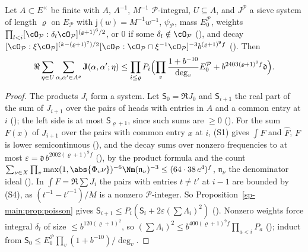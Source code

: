 \begin{theorem}\label{sp-main:thm:sieve}
Let $A\subset E^\times$ be finite with $A$, $A^{-1}$, $M^{-1}$ $\mathcal P$-integral, $U\subseteq A$, and
$J^{\mathcal P}$ a sieve system of length $\varrho$ on $E_{\mathcal P}$ with $\mathsf j(w)=M^{-1}w^{-1}$, $\psi_{\mathcal P}$,
mass $E^{\mathcal P}_0$, weights $\prod_{l<i}[\cO_{\mathcal P}:\delta_l\cO_{\mathcal P}]^{(\varrho+1)^6/2}$, or $0$ if some
$\delta_l\notin\cO_{\mathcal P}$ (), and decay $[\cO_{\mathcal P}:\xi\cO_{\mathcal P}]^{(k-
(\varrho+1)^7)/2}[\cO_{\mathcal P}:\cO_{\mathcal P}\cap\xi^{-1}\cO_{\mathcal P}]^{-3}b^{(\varrho+1)^9f}$
(). Then
\[
\Re\sum_{\eta\in U}\sum_{\alpha,\alpha'\in A^\varrho}\mathbf J(\alpha,\alpha';\eta)\le
\prod_{i\le\varrho}P_i\Bigl(\prod_v\frac{1+b^{-10}}{\deg_v}E^{\mathcal P}_0+b^{2403(\varrho+1)^9f}\mathfrak d\Bigr).
\]
\end{theorem}

\begin{proof}
The products $J_i$ form a system. Let $\mathsf S_0=\Re J_0$ and $\mathsf S_{i+1}$ the real part of the sum of
$J_{i+1}$ over the pairs of heads with entries in $A$ and a common entry at $i$
(); the left side is at most $\mathsf S_{\varrho+1}$, since such sums are $\ge0$
(). For the sum $F(x)$ of $J_{i+1}$ over the pairs with common entry
$x$ at $i$, (S1) gives $\int F$ and $\hat F$, $F$ is lower semicontinuous
(), and the decay sums over nonzero frequencies to at
most $\varepsilon=\mathfrak d\,b^{2002(\varrho+1)^9f}$ (), by the
product formula and the count $\sum_{\nu\in X}\prod_v\max(1,\abs{\Phi_v\nu})^{-6}
\Nm(\mathfrak n_\nu)^{-3}\le(64\cdot38\,e^4)^f$, $\mathfrak n_\nu$ the denominator ideal
(). In $\int F=\Re\sum J_i$ the pairs with entries $t\ne t'$ at
$i-1$ are bounded by (S4), as $(t^{-1}-t'^{-1})/M$ is a nonzero $\mathcal P$-integer. So
Proposition~\ref{sp-main:prop:poisson} gives $\mathsf S_{i+1}\le P_i(\mathsf S_i+2\varepsilon(\sum\Lambda_i)^2)$
(). Nonzero weights force integral
$\delta_l$ of size $\le b^{120(\varrho+1)^2}$, so $(\sum\Lambda_i)^2\le b^{400(\varrho+1)^9f}\prod_{a<i}P_a$
(); induct from $\mathsf S_0\le E^{\mathcal P}_0\prod_v(1+b^{-10})/\deg_v$.
\end{proof}

